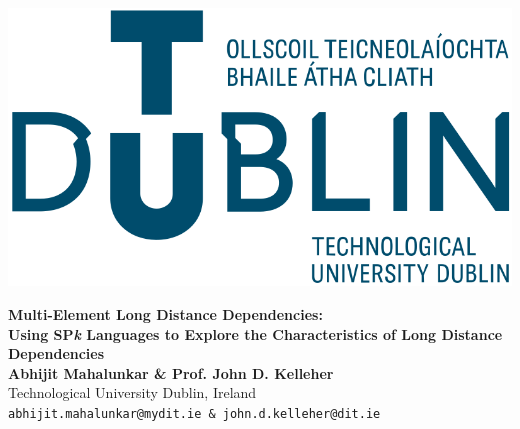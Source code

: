 \documentclass[a0,portrait]{a0poster}
\begin{document}
\begin{minipage}[c]{0.25\linewidth}
\includegraphics[width=16.5cm]{logo.png}\\
\end{minipage}
\begin{minipage}[c]{0.75\linewidth}
\veryHuge \color{tudLogoColor} \textbf{Multi-Element Long Distance Dependencies:}\\ %
\Huge\textbf{Using SP\emph{k} Languages to Explore the Characteristics of Long Distance Dependencies} \color{Black}\\[1cm] %
\huge{}\textbf{Abhijit Mahalunkar \& Prof. John D. Kelleher}\\[0.5cm]
\huge Technological University Dublin, Ireland\\[0.4cm]
\Large \texttt{abhijit.mahalunkar@mydit.ie \& john.d.kelleher@dit.ie}\\
\end{minipage}

\end{document}
